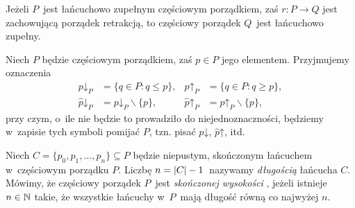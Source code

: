 \begin{lem}\label{retrakt_lanc_zup_jest_lanc_zup}
Jeżeli $P$~jest łańcuchowo zupełnym częściowym porządkiem, zaś $r\colon P\to Q$ jest zachowującą porządek retrakcją, to częściowy porządek $Q$~jest łańcuchowo zupełny.
\end{lem}

Niech $P$ będzie częściowym porządkiem, zaś $p\in P$ jego elementem. Przyjmujemy oznaczenia 
\begin{align*}p\mathord{\downarrow}_P&=\{q\in P:q\leq p\},& p\mathord{\uparrow}_P&=\{q\in P:q\geq p\},\\ \hat{p}\mathord{\downarrow}_P&=p\mathord{\downarrow}_P\smallsetminus\{p\},& \hat{p}\mathord{\uparrow}_P&=p\mathord{\uparrow}_P\smallsetminus\{p\},\end{align*}
 przy czym, o~ile nie będzie to prowadziło do niejednoznaczności, będziemy w~zapisie tych symboli pomijać $P$, tzn. pisać $p\mathord{\downarrow}$, $\hat{p}\mathord{\uparrow}$, itd.

Niech $C=\{p_0,p_1,\ldots,p_n\}\subseteq P$ będzie niepustym, skończonym łańcuchem w~częściowym porządku $P$. Liczbę $n=\left|C\right|-1$~nazywamy \textit{długością} łańcucha $C$. Mówimy, że częściowy porządek $P$~jest \textit{skończonej wysokości} , jeżeli istnieje $n\in\mathbb{N}$ takie, że wszystkie łańcuchy w~$P$~mają długość równą co najwyżej $n$.

